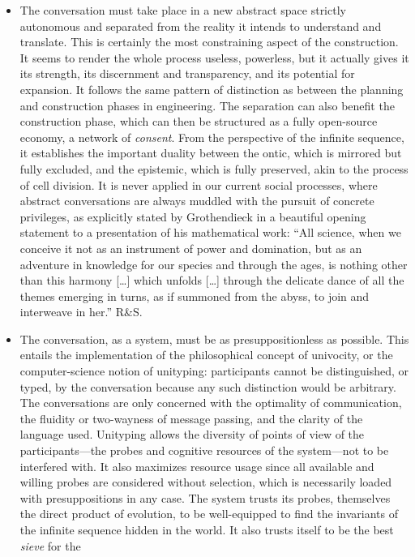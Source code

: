 \documentclass[11pt]{article}
\begin{document}
\begin{itemize}
\item The conversation must take place in a new abstract space strictly
autonomous and separated from the reality it intends to understand and
translate. This is certainly the most constraining aspect of the construction.
It seems to render the whole process useless, powerless, but it actually gives
it its strength, its discernment and transparency, and its potential for
expansion. It follows the same pattern of distinction as between the planning
and construction phases in engineering. The separation can also benefit the
construction phase, which can then be structured as a fully open-source
economy, a network of \emph{consent}. From the perspective of the infinite
sequence, it establishes the important duality between the ontic, which is
mirrored but fully excluded, and the epistemic, which is fully preserved, akin
to the process of cell division. It is never applied in our current social
processes, where abstract conversations are always muddled with the pursuit of
concrete privileges, as explicitly stated by Grothendieck in a beautiful
opening statement to a presentation of his mathematical work: ``All science,
when we conceive it not as an instrument of power and domination, but as an
adventure in knowledge for our species and through the ages, is nothing other
than this harmony [\ldots] which unfolds [\ldots] through the delicate dance of
all the themes emerging in turns, as if summoned from the abyss, to join and
interweave in her.'' R\&S.
\item The conversation, as a system, must be as presuppositionless as possible.
This entails the implementation of the philosophical concept of univocity, or
the computer-science notion of unityping: participants cannot be distinguished,
or typed, by the conversation because any such distinction would be arbitrary.
The conversations are only concerned with the optimality of communication, the
fluidity or two-wayness of message passing, and the clarity of the language
used. Unityping allows the diversity of points of view of the participants---the
probes and cognitive resources of the system---not to be interfered with. It
also maximizes resource usage since all available and willing probes are
considered without selection, which is necessarily loaded with presuppositions
in any case. The system trusts its probes, themselves the direct product of
evolution, to be well-equipped to find the invariants of the infinite sequence
hidden in the world. It also trusts itself to be the best \emph{sieve} for the

\end{itemize}
\end{document}
